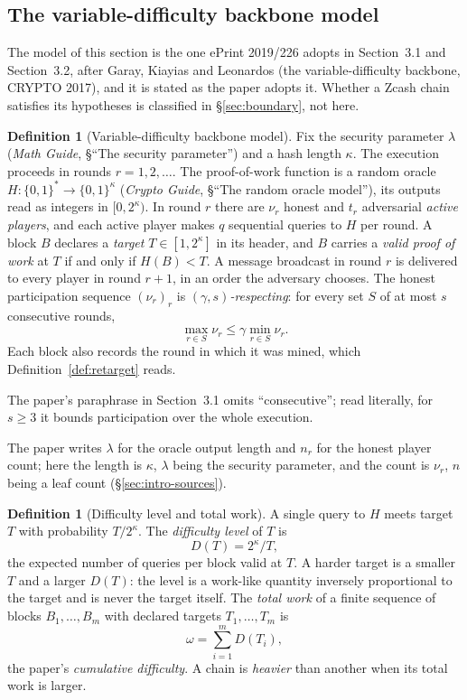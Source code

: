 \documentclass[11pt,a4paper]{article}
\theoremstyle{definition}
\newtheorem{definition}[theorem]{Definition}
\begin{document}
\subsection{The variable-difficulty backbone model}\label{sec:model-backbone}

The model of this section is the one ePrint 2019/226 adopts in Section~3.1
and Section~3.2, after Garay, Kiayias and Leonardos (the variable-difficulty
backbone, CRYPTO 2017), and it is stated as the paper adopts it. Whether a
Zcash chain satisfies its hypotheses is classified in
\S\ref{sec:boundary}, not here.

\begin{definition}[Variable-difficulty backbone model]\label{def:backbone}
Fix the security parameter $\lambda$ (\emph{Math Guide}, \S``The security
parameter'') and a hash length $\kappa$. The execution proceeds in rounds
$r = 1, 2, \ldots$. The proof-of-work function is a random oracle
$H \colon \{0,1\}^* \to \{0,1\}^\kappa$ (\emph{Crypto Guide}, \S``The random
oracle model''), its outputs read as integers in $[0, 2^\kappa)$. In round
$r$ there are $\nu_r$ honest and $t_r$ adversarial \emph{active players},
and each active player makes $q$ sequential queries to $H$ per round. A block
$B$ declares a \emph{target} $T \in [1, 2^\kappa]$ in its header, and $B$
carries a \emph{valid proof of work} at $T$ if and only if $H(B) < T$. A
message broadcast in round $r$ is delivered to every player in round $r + 1$,
in an order the adversary chooses. The honest participation sequence
$(\nu_r)_r$ is \emph{$(\gamma, s)$-respecting}: for every set $S$ of at most
$s$ consecutive rounds,
\[
  \max_{r \in S} \nu_r \le \gamma \min_{r \in S} \nu_r .
\]
Each block also records the round in which it was mined, which
Definition~\ref{def:retarget} reads.
\end{definition}

The paper's paraphrase in Section~3.1 omits ``consecutive''; read literally,
for $s \ge 3$ it bounds participation over the whole execution.

The paper writes $\lambda$ for the oracle output length and $n_r$ for the
honest player count; here the length is $\kappa$, $\lambda$ being the
security parameter, and the count is $\nu_r$, $n$ being a leaf count
(\S\ref{sec:intro-sources}).

\begin{definition}[Difficulty level and total work]
\label{def:difficulty-level}
A single query to $H$ meets target $T$ with probability $T / 2^\kappa$. The
\emph{difficulty level} of $T$ is
\[
  D(T) = 2^\kappa / T ,
\]
the expected number of queries per block valid at $T$. A harder target is a
smaller $T$ and a larger $D(T)$: the level is a work-like quantity inversely
proportional to the target and is never the target itself. The \emph{total
work} of a finite sequence of blocks $B_1, \ldots, B_m$ with declared targets
$T_1, \ldots, T_m$ is
\[
  \omega = \sum_{i=1}^{m} D(T_i) ,
\]
the paper's \emph{cumulative difficulty}. A chain is \emph{heavier} than
another when its total work is larger.
\end{definition}
\end{document}
